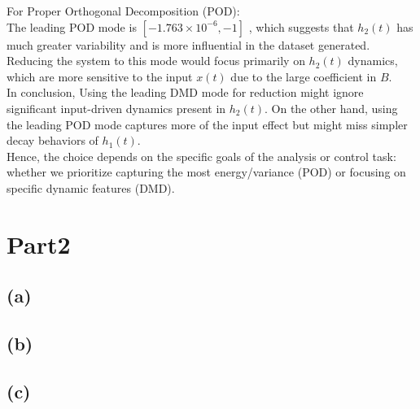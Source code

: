 \documentclass[12pt]{article}
\begin{document}
For Proper Orthogonal Decomposition (POD): \\
The leading POD mode is $[-1.763 \times 10^{-6},-1]$ , which suggests that $h_2(t)$ has much greater variability and is more influential in the dataset generated. Reducing the system to this mode would focus primarily on $h_2(t)$ dynamics, which are more sensitive to the input $x(t)$ due to the large coefficient in $B$.\\

In conclusion, Using the leading DMD mode for reduction might ignore significant input-driven dynamics present in $h_2(t)$. On the other hand, using the leading POD mode captures more of the input effect but might miss simpler decay behaviors of $h_1(t)$. \\
Hence, the choice depends on the specific goals of the analysis or control task: whether we prioritize capturing the most energy/variance (POD) or focusing on specific dynamic features (DMD).




\section*{Part2}
\subsection*{(a)}


\subsection*{(b)}

\subsection*{(c)}
\end{document}
